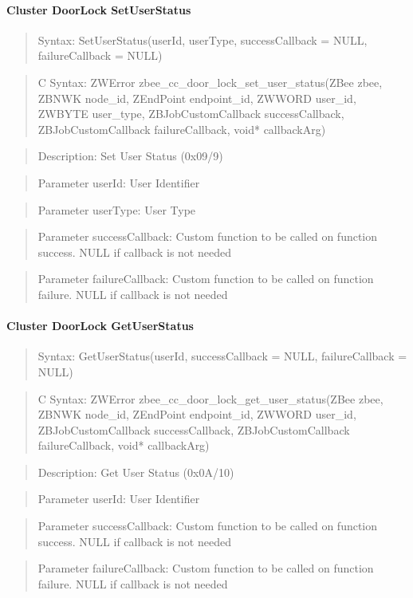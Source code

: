 \paragraph{Cluster DoorLock SetUserStatus}
\begin{quote}Syntax: SetUserStatus(userId, userType, successCallback = NULL, failureCallback = NULL)\end{quote}
\begin{quote}C Syntax: ZWError zbee\_cc\_door\_lock\_set\_user\_status(ZBee zbee, ZBNWK node\_id, ZEndPoint endpoint\_id, ZWWORD user\_id, ZWBYTE user\_type, ZBJobCustomCallback successCallback, ZBJobCustomCallback failureCallback, void* callbackArg)\end{quote}
\begin{quote}Description: Set User Status (0x09/9)\end{quote}
\begin{quote}Parameter userId: User Identifier\end{quote}
\begin{quote}Parameter userType: User Type\end{quote}
\begin{quote}Parameter successCallback: Custom function to be called on function success. NULL if callback is not needed\end{quote}
\begin{quote}Parameter failureCallback: Custom function to be called on function failure. NULL if callback is not needed\end{quote}


\paragraph{Cluster DoorLock GetUserStatus}
\begin{quote}Syntax: GetUserStatus(userId, successCallback = NULL, failureCallback = NULL)\end{quote}
\begin{quote}C Syntax: ZWError zbee\_cc\_door\_lock\_get\_user\_status(ZBee zbee, ZBNWK node\_id, ZEndPoint endpoint\_id, ZWWORD user\_id, ZBJobCustomCallback successCallback, ZBJobCustomCallback failureCallback, void* callbackArg)\end{quote}
\begin{quote}Description: Get User Status (0x0A/10)\end{quote}
\begin{quote}Parameter userId: User Identifier\end{quote}
\begin{quote}Parameter successCallback: Custom function to be called on function success. NULL if callback is not needed\end{quote}
\begin{quote}Parameter failureCallback: Custom function to be called on function failure. NULL if callback is not needed\end{quote}



